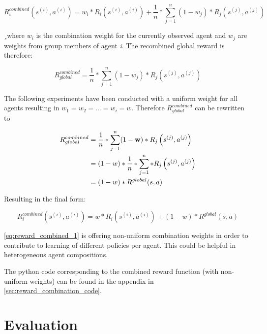 
\begin{equation}\label{eq:reward_combined_1}
	R_{i}^{combined}\left(s^{(i)}, a^{(i)}\right) = w_{i} * R_{i}\left(s^{(i)}, a^{(i)}\right) + \dfrac{1}{n} * \sum_{j=1}^{n} (1-w_{j}) * R_{j}\left(s^{(j)}, a^{(j)}\right)
\end{equation}

¸where $w_{i}$ is the combination weight for the currently observed agent and $w_{j}$ are weights from group members of agent \textit{i}. The recombined global reward is therefore:

\begin{equation}\label{eq:reward_combined_2}
	R_{global}^{combined} = \dfrac{1}{n} * \sum_{j=1}^{n} (1-w_{j}) * R_{j}\left(s^{(j)}, a^{(j)}\right)
\end{equation}

The following experiments have been conducted with a uniform weight for all agents resulting in $w_{1}=w_{2}=...=w_{i}=w$. Therefore $R_{global}^{combined}$ can be rewritten to

\begin{align}\label{eq:reward_combined_3}
	R_{global}^{combined} & = \dfrac{1}{n} * \sum_{j=1}^{n} (1-\mathbf{w}) * R_{j}\left(s^{(j)}, a^{(j)}\right) \notag \\ 
	& = (1-w) * \dfrac{1}{n} * \sum_{j=1}^{n}  * R_{j}\left(s^{(j)}, a^{(j)}\right) \notag \\
	& = (1-w) * R^{global}(s, a)
\end{align}

Resulting in the final form:

\begin{equation}\label{eq:reward_combined_4}
	R_{i}^{combined}\left(s^{(i)}, a^{(i)}\right) = w * R_{i}\left(s^{(i)}, a^{(i)}\right) + (1-w) * R^{global}(s, a)
\end{equation}

\autoref{eq:reward_combined_1} is offering non-uniform combination weights in order to contribute to learning of different policies per agent. This could be helpful in heterogeneous agent compositions.

The python code corresponding to the combined reward function (with non-uniform weights) can be found in the appendix in \autoref{sec:reward_combination_code}.
\chapter{Evaluation}
